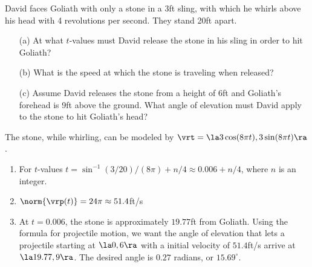 {David faces Goliath with only a stone in a 3ft sling, with which he whirls above his head with 4 revolutions per second. They stand 20ft apart.
\begin{enumerate}
	\item [(a)]	At what $t$-values must David release the stone in his sling in order to hit Goliath?
	\item	[(b)] What is the speed at which the stone is traveling when released?
	\item	[(c)] Assume David releases the stone from a height of 6ft and Goliath's forehead is 9ft above the ground. What angle of elevation must David apply to the stone to hit Goliath's head?
\end{enumerate}
}
{The stone, while whirling, can be modeled by $\vrt = \la 3\cos(8\pi t),3\sin (8\pi t)\ra$. 
\begin{enumerate}
	\item For $t$-values $t=\sin^{-1}(3/20)/(8\pi) + n/4 \approx 0.006 + n/4$, where $n$ is an integer.
	\item		$\norm{\vrp(t)} = 24\pi\approx 51.4$ft/s
	\item		At $t=0.006$, the stone is approximately $19.77$ft from Goliath. Using the formula for projectile motion, we want the angle of elevation that lets a projectile starting at $\la 0,6\ra$ with a initial velocity of $51.4$ft/s arrive at $\la 19.77,9\ra$. The desired angle is $0.27$ radians, or $15.69^\circ$.
\end{enumerate}
}